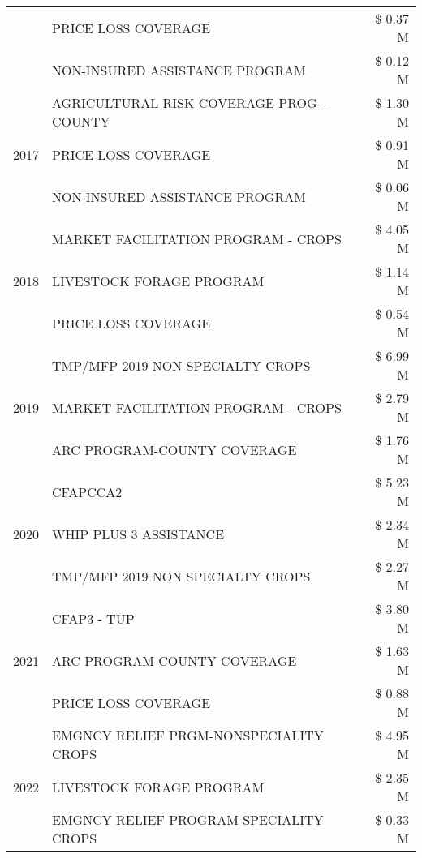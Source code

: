 \begin{tabular}{llr}
 & PRICE LOSS COVERAGE & \$ 0.37 M \\
 & NON-INSURED ASSISTANCE PROGRAM & \$ 0.12 M \\
\cline{1-3}
\multirow[t]{3}{*}{2017} & AGRICULTURAL RISK COVERAGE PROG - COUNTY & \$ 1.30 M \\
 & PRICE LOSS COVERAGE & \$ 0.91 M \\
 & NON-INSURED ASSISTANCE PROGRAM & \$ 0.06 M \\
\cline{1-3}
\multirow[t]{3}{*}{2018} & MARKET FACILITATION PROGRAM - CROPS & \$ 4.05 M \\
 & LIVESTOCK FORAGE PROGRAM & \$ 1.14 M \\
 & PRICE LOSS COVERAGE & \$ 0.54 M \\
\cline{1-3}
\multirow[t]{3}{*}{2019} & TMP/MFP 2019 NON SPECIALTY CROPS & \$ 6.99 M \\
 & MARKET FACILITATION PROGRAM - CROPS & \$ 2.79 M \\
 & ARC PROGRAM-COUNTY COVERAGE & \$ 1.76 M \\
\cline{1-3}
\multirow[t]{3}{*}{2020} & CFAPCCA2 & \$ 5.23 M \\
 & WHIP PLUS 3 ASSISTANCE & \$ 2.34 M \\
 & TMP/MFP 2019 NON SPECIALTY CROPS & \$ 2.27 M \\
\cline{1-3}
\multirow[t]{3}{*}{2021} & CFAP3 - TUP & \$ 3.80 M \\
 & ARC PROGRAM-COUNTY COVERAGE & \$ 1.63 M \\
 & PRICE LOSS COVERAGE & \$ 0.88 M \\
\cline{1-3}
\multirow[t]{3}{*}{2022} & EMGNCY RELIEF PRGM-NONSPECIALITY CROPS & \$ 4.95 M \\
 & LIVESTOCK FORAGE PROGRAM & \$ 2.35 M \\
 & EMGNCY RELIEF PROGRAM-SPECIALITY CROPS & \$ 0.33 M \\
\cline{1-3}
\bottomrule
\end{tabular}
